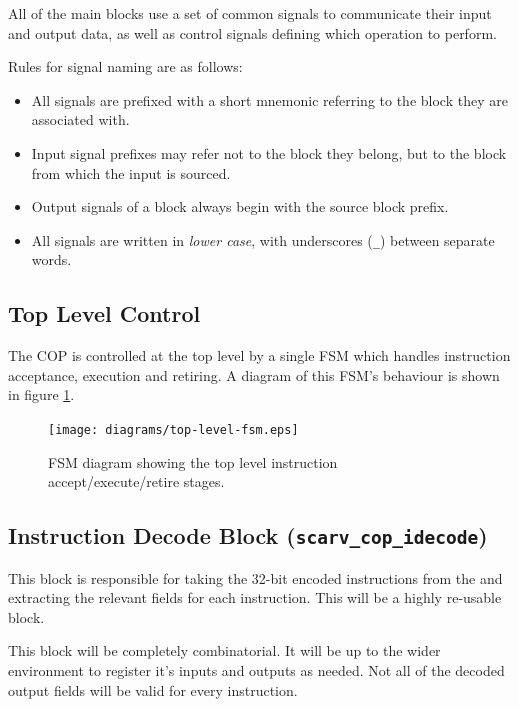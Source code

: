 \documentclass{article}
\begin{document}
All of the main blocks use a set of common signals to communicate their
input and output data, as well as control signals defining which operation
to perform.

Rules for signal naming are as follows:
\begin{itemize}
\item All signals are prefixed with a short mnemonic referring to the
    block they are associated with.
\item Input signal prefixes may refer not to the block they belong, but
    to the block from which the input is sourced.
\item Output signals of a block always begin with the source block prefix.
\item All signals are written in {\em lower case}, with underscores ({\tt \_})
    between separate words.
\end{itemize}

\subsection{Top Level Control}

The COP is controlled at the top level by a single FSM which handles
instruction acceptance, execution and retiring. A diagram of this FSM's
behaviour is shown in figure \ref{fig:top-level-fsm}.

\begin{figure}[H]
\centering
\texttt{[image: diagrams/top-level-fsm.eps]}
\caption{FSM diagram showing the top level instruction accept/execute/retire
stages.}
\label{fig:top-level-fsm}
\end{figure}


\subsection{Instruction Decode Block ({\tt scarv\_cop\_idecode})}

This block is responsible for taking the 32-bit encoded instructions from
the \cpucopif and extracting the relevant fields for each instruction. This
will be a highly re-usable block.

This block will be completely combinatorial. It will be up to the wider
environment to register it's inputs and outputs as needed. Not all of the
decoded output fields will be valid for every instruction.
\end{document}
